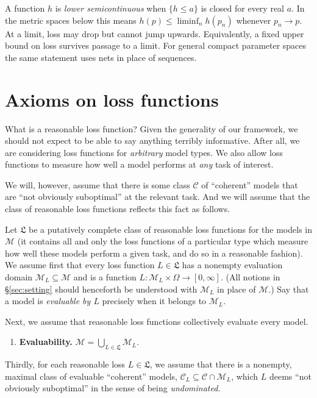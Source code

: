 \documentclass[11pt]{article}
\theoremstyle{definition}
\theoremstyle{remark}
\newcommand{\M}{\mathcal M}
\newcommand{\C}{\mathcal C}
\begin{document}
A function $h$ is \emph{lower semicontinuous} when $\{h\le a\}$ is closed for every real $a$. In the metric spaces below this means $h(p)\le\liminf_n h(p_n)$ whenever $p_n\to p$. At a limit, loss may drop but cannot jump upwards. Equivalently, a fixed upper bound on loss survives passage to a limit. For general compact parameter spaces the same statement uses nets in place of sequences.



\section{Axioms on loss functions}\label{sec:axioms}

What is a reasonable loss function? Given the generality of our framework, we should not expect to be able to say anything terribly informative. After all, we are considering loss functions for \textit{arbitrary} model types. We also allow loss functions to measure how well a model performs at \textit{any} task of interest.



We will, however, assume that there is some class $\C$ of ``coherent'' models that are ``not obviously suboptimal'' at the relevant task. And we will assume that the class of reasonable loss functions reflects this fact as follows. 


Let $\mathfrak L$ be a putatively complete class of reasonable loss functions for the models in $\M$ (it contains all and only the loss functions of a particular type which measure how well these models perform a given task, and do so in a reasonable fashion). We assume first that every loss function $L\in\mathfrak L$ has a nonempty evaluation domain $\M_L\subseteq\M$ and is a function $L:\M_L\times\Omega\to[0,\infty]$. (All notions in \S\ref{sec:setting} should henceforth be understood with $\M_L$ in place of $\M$.) Say that a model is \emph{evaluable by $L$} precisely when it belongs to $\M_L$. 



Next, we assume that reasonable loss functions collectively evaluate every model.
\begin{enumerate}[label=\textbf{(E)},leftmargin=*]
\item \textbf{Evaluability.} $\M=\bigcup_{L\in\mathfrak L}\M_L$.
\end{enumerate}

Thirdly, for each reasonable loss $L\in\mathfrak L$, we assume that there is a nonempty, maximal class of evaluable ``coherent'' models, $\C_L\subseteq\C\cap\M_L$, which $L$ deems ``not obviously suboptimal'' in the sense of being \textit{undominated}.
\end{document}
